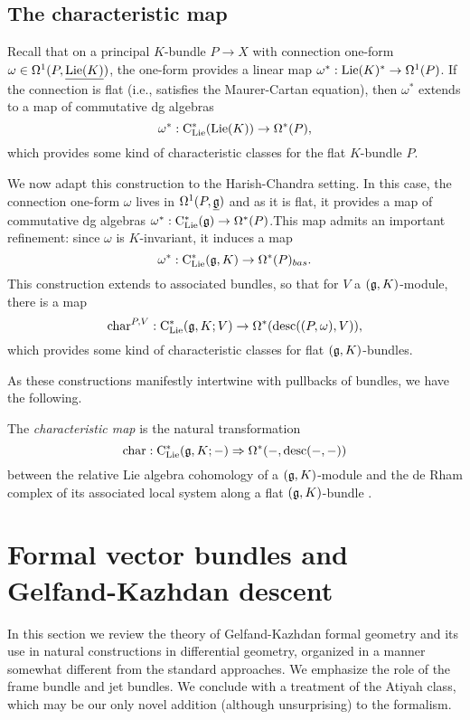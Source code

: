 \subsection{The characteristic map}

Recall that on a principal $K$-bundle $P \to X$ with connection one-form $\omega \in \Omega^1(P,\underline{{\rm Lie}(K)})$, 
the one-form provides a linear map $\omega^*: {\rm Lie}(K)^* \to \Omega^1(P)$.
If the connection is flat (i.e., satisfies the Maurer-Cartan equation), 
then $\omega^*$ extends to a map of commutative dg algebras
\[
\omega^*: {\rm C}_{{\rm Lie}}^*({\rm Lie}(K)) \to \Omega^*(P),
\]
which provides some kind of characteristic classes for the flat $K$-bundle $P$.

We now adapt this construction to the Harish-Chandra setting.
In this case, the connection one-form $\omega$ lives in $\Omega^1(P, \underline{\mathfrak g})$ and as it is flat,
it provides a map of commutative dg algebras $\omega^*: {\rm C}_{{\rm Lie}}^*(\mathfrak g) \to \Omega^*(P)$.This map admits an important refinement: since $\omega$ is $K$-invariant, it induces a map
\[
\omega^*: {\rm C}_{{\rm Lie}}^*(\mathfrak g,K) \to \Omega^*(P)_{bas}.
\]
This construction extends to associated bundles, so that for $V$ a $(\mathfrak g,K)$-module, there is a map
\[
{\rm char}^{P,V} : {\rm C}_{{\rm Lie}}^*(\mathfrak g, K; V) \to \Omega^*({\rm desc}((P,\omega),V)), 
\]
which provides some kind of characteristic classes for flat $(\mathfrak g,K)$-bundles.

As these constructions manifestly intertwine with pullbacks of bundles, we have the following.

\begin{dfn}
The {\em characteristic map} is the natural transformation
\[
{\rm char} : {\rm C}_{{\rm Lie}}^*(\mathfrak g,K; -) \Rightarrow \Omega^*(-, {\rm desc}(-,-))
\]
between the relative Lie algebra cohomology of a $(\mathfrak g,K)$-module and 
the de Rham complex of its associated local system along a flat $(\mathfrak g,K)$-bundle .
\end{dfn}

\section{Formal vector bundles and Gelfand-Kazhdan descent}\label{sec
  gk descent}

In this section we review the theory of Gelfand-Kazhdan formal geometry and its use in natural constructions in differential geometry,
organized in a manner somewhat different from the standard
approaches. We emphasize the role of the frame bundle and jet bundles.
We conclude with a treatment of the Atiyah class, which may be our only novel addition (although unsurprising) to the formalism.

